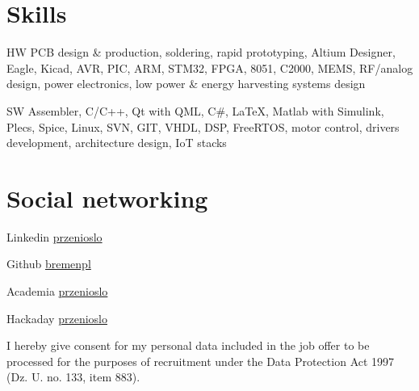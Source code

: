 \documentclass{tccv}
\begin{document}
\section{Skills}

\begin{factlist}

\item{HW}
     {PCB design \& production, soldering, rapid prototyping, Altium Designer, Eagle, Kicad, AVR, PIC, ARM, STM32, FPGA, 8051, C2000, MEMS, RF/analog design, power electronics, low power \& energy harvesting systems design}

\item{SW}
     {Assembler, C/C++, Qt with QML, C\#, \LaTeX, Matlab with Simulink, Plecs, Spice, Linux, SVN, GIT, VHDL, DSP, FreeRTOS, motor control, drivers development, architecture design, IoT stacks}

\end{factlist}

\section{Social networking}

\begin{factlist}

\item{Linkedin}
     {\href{http://pl.linkedin.com/in/przenioslo}{przenioslo}}
     
\item{Github}
     {\href{http://github.com/bremenpl}{bremenpl}}
     
\item{Academia}
     {\href{https://zut.academia.edu/przenioslo}{przenioslo}}
     
\item{Hackaday}
     {\href{http://hackaday.io/przenioslo}{przenioslo}}  

\end{factlist} 

\vspace*{\fill} %

{\scriptsize I hereby give consent for my personal data included in the job offer to be processed for the purposes of recruitment under the Data Protection Act 1997 (Dz. U. no. 133, item 883).}
\end{document}
